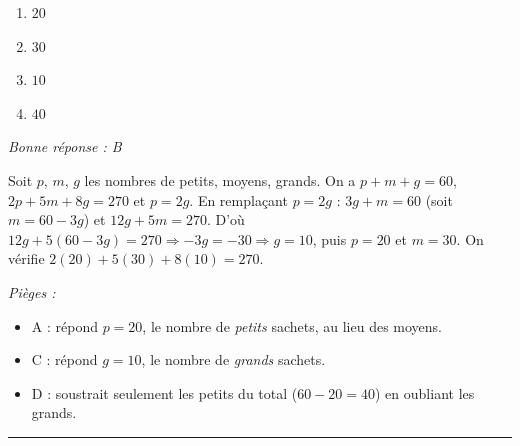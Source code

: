\documentclass[11pt,a4paper]{article}
\begin{document}
\begin{enumerate}[label=\Alph*)]
\item $20$
\item $30$
\item $10$
\item $40$
\end{enumerate}
\textit{Bonne réponse : B}\par
Soit $p$, $m$, $g$ les nombres de petits, moyens, grands. On a $p+m+g=60$, $2p+5m+8g=270$ et $p=2g$. En rempla\c cant $p=2g$ : $3g+m=60$ (soit $m=60-3g$) et $12g+5m=270$. D'o\`u $12g+5(60-3g)=270\Rightarrow -3g=-30\Rightarrow g=10$, puis $p=20$ et $m=30$. On v\'erifie $2(20)+5(30)+8(10)=270$.\par
\textit{Pièges :}
\begin{itemize}
\item A : r\'epond $p=20$, le nombre de \emph{petits} sachets, au lieu des moyens.
\item C : r\'epond $g=10$, le nombre de \emph{grands} sachets.
\item D : soustrait seulement les petits du total ($60-20=40$) en oubliant les grands.
\end{itemize}
\vspace{8pt}\hrule\vspace{8pt}
\end{document}
